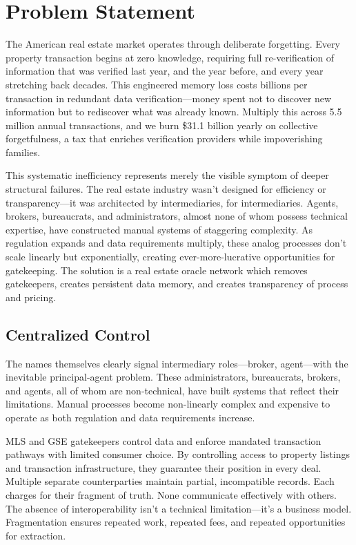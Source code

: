 \chapter{Problem Statement}

The American real estate market operates through deliberate forgetting. Every property transaction begins at zero knowledge, requiring full re-verification of information that was verified last year, and the year before, and every year stretching back decades. This engineered memory loss costs billions per transaction in redundant data verification---money spent not to discover new information but to rediscover what was already known. Multiply this across 5.5 million annual transactions, and we burn \$31.1 billion yearly on collective forgetfulness, a tax that enriches verification providers while impoverishing families.

This systematic inefficiency represents merely the visible symptom of deeper structural failures. The real estate industry wasn't designed for efficiency or transparency---it was architected by intermediaries, for intermediaries. Agents, brokers, bureaucrats, and administrators, almost none of whom possess technical expertise, have constructed manual systems of staggering complexity. As regulation expands and data requirements multiply, these analog processes don't scale linearly but exponentially, creating ever-more-lucrative opportunities for gatekeeping. The solution is a real estate oracle network which removes gatekeepers, creates persistent data memory, and creates transparency of process and pricing.

\section{Centralized Control}

The names themselves clearly signal intermediary roles---broker, agent---with the inevitable principal-agent problem. These administrators, bureaucrats, brokers, and agents, all of whom are non-technical, have built systems that reflect their limitations. Manual processes become non-linearly complex and expensive to operate as both regulation and data requirements increase.

MLS and GSE gatekeepers control data and enforce mandated transaction pathways with limited consumer choice. By controlling access to property listings and transaction infrastructure, they guarantee their position in every deal. Multiple separate counterparties maintain partial, incompatible records. Each charges for their fragment of truth. None communicate effectively with others. The absence of interoperability isn't a technical limitation---it's a business model. Fragmentation ensures repeated work, repeated fees, and repeated opportunities for extraction.

